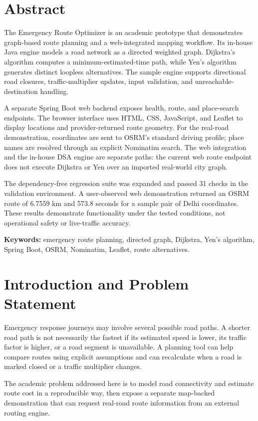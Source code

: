 \documentclass[11pt,a4paper]{article}
\begin{document}
\tableofcontents
\newpage

\section{Abstract}
The Emergency Route Optimizer is an academic prototype that demonstrates graph-based route planning and a web-integrated mapping workflow. Its in-house Java engine models a road network as a directed weighted graph. Dijkstra's algorithm computes a minimum-estimated-time path, while Yen's algorithm generates distinct loopless alternatives. The sample engine supports directional road closures, traffic-multiplier updates, input validation, and unreachable-destination handling.

A separate Spring Boot web backend exposes health, route, and place-search endpoints. The browser interface uses HTML, CSS, JavaScript, and Leaflet to display locations and provider-returned route geometry. For the real-road demonstration, coordinates are sent to OSRM's standard driving profile; place names are resolved through an explicit Nominatim search. The web integration and the in-house DSA engine are separate paths: the current web route endpoint does not execute Dijkstra or Yen over an imported real-world city graph.

The dependency-free regression suite was expanded and passed 31 checks in the validation environment. A user-observed web demonstration returned an OSRM route of 6.7559 km and 573.8 seconds for a sample pair of Delhi coordinates. These results demonstrate functionality under the tested conditions, not operational safety or live-traffic accuracy.

\textbf{Keywords:} emergency route planning, directed graph, Dijkstra, Yen's algorithm, Spring Boot, OSRM, Nominatim, Leaflet, route alternatives.

\section{Introduction and Problem Statement}
Emergency response journeys may involve several possible road paths. A shorter road path is not necessarily the fastest if its estimated speed is lower, its traffic factor is higher, or a road segment is unavailable. A planning tool can help compare routes using explicit assumptions and can recalculate when a road is marked closed or a traffic multiplier changes.

The academic problem addressed here is to model road connectivity and estimate route cost in a reproducible way, then expose a separate map-backed demonstration that can request real-road route information from an external routing engine.
\end{document}
